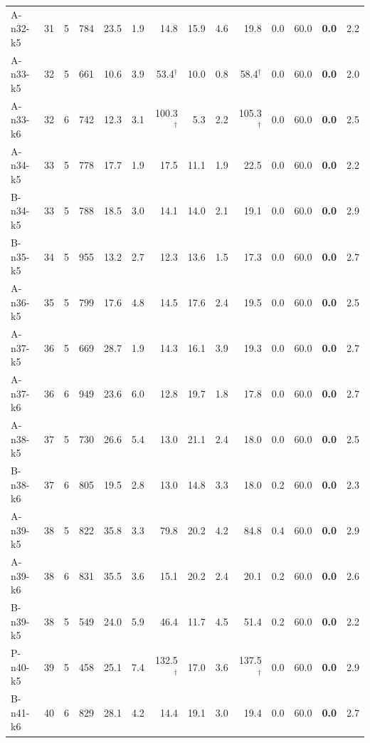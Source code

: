 \documentclass[preprint,3p,12pt,authoryear]{elsarticle}
\begin{document}
\begin{table}[h!]
{\begin{tabular}{lrrr|rrr|rrr|rr|rr}
A-n32-k5  & 31 & 5 & 784 & 23.5 & 1.9 & 14.8 & 15.9 & 4.6 & 19.8 & 0.0 & 60.0 & {\color{red}\textbf{0.0}} & {\color{red}2.2} \\
A-n33-k5  & 32 & 5 & 661 & 10.6 & 3.9 & 53.4$^\dagger$ & 10.0 & 0.8 & 58.4$^\dagger$ & 0.0 & 60.0 & {\color{red}\textbf{0.0}} & {\color{red}2.0} \\
A-n33-k6  & 32 & 6 & 742 & 12.3 & 3.1 & 100.3$^\dagger$ & 5.3 & 2.2 & 105.3$^\dagger$ & 0.0 & 60.0 & {\color{red}\textbf{0.0}} & {\color{red}2.5} \\
A-n34-k5  & 33 & 5 & 778 & 17.7 & 1.9 & 17.5 & 11.1 & 1.9 & 22.5 & 0.0 & 60.0 & {\color{red}\textbf{0.0}} & {\color{red}2.2} \\
B-n34-k5  & 33 & 5 & 788 & 18.5 & 3.0 & 14.1 & 14.0 & 2.1 & 19.1 & 0.0 & 60.0 & {\color{red}\textbf{0.0}} & {\color{red}2.9} \\
B-n35-k5  & 34 & 5 & 955 & 13.2 & 2.7 & 12.3 & 13.6 & 1.5 & 17.3 & 0.0 & 60.0 & {\color{red}\textbf{0.0}} & {\color{red}2.7} \\
A-n36-k5  & 35 & 5 & 799 & 17.6 & 4.8 & 14.5 & 17.6 & 2.4 & 19.5 & 0.0 & 60.0 & {\color{red}\textbf{0.0}} & {\color{red}2.5} \\
A-n37-k5  & 36 & 5 & 669 & 28.7 & 1.9 & 14.3 & 16.1 & 3.9 & 19.3 & 0.0 & 60.0 & {\color{red}\textbf{0.0}} & {\color{red}2.7} \\
A-n37-k6  & 36 & 6 & 949 & 23.6 & 6.0 & 12.8 & 19.7 & 1.8 & 17.8 & 0.0 & 60.0 & {\color{red}\textbf{0.0}} & {\color{red}2.7} \\
A-n38-k5  & 37 & 5 & 730 & 26.6 & 5.4 & 13.0 & 21.1 & 2.4 & 18.0 & 0.0 & 60.0 & {\color{red}\textbf{0.0}} & {\color{red}2.5} \\
B-n38-k6  & 37 & 6 & 805 & 19.5 & 2.8 & 13.0 & 14.8 & 3.3 & 18.0 & 0.2 & 60.0 & {\color{red}\textbf{0.0}} & {\color{red}2.3} \\
A-n39-k5  & 38 & 5 & 822 & 35.8 & 3.3 & 79.8 & 20.2 & 4.2 & 84.8 & 0.4 & 60.0 & {\color{red}\textbf{0.0}} & {\color{red}2.9} \\
A-n39-k6  & 38 & 6 & 831 & 35.5 & 3.6 & 15.1 & 20.2 & 2.4 & 20.1 & 0.2 & 60.0 & {\color{red}\textbf{0.0}} & {\color{red}2.6} \\
B-n39-k5  & 38 & 5 & 549 & 24.0 & 5.9 & 46.4 & 11.7 & 4.5 & 51.4 & 0.2 & 60.0 & {\color{red}\textbf{0.0}} & {\color{red}2.2} \\
P-n40-k5  & 39 & 5 & 458 & 25.1 & 7.4 & 132.5$^\dagger$ & 17.0 & 3.6 & 137.5$^\dagger$ & 0.0 & 60.0 & {\color{red}\textbf{0.0}} & {\color{red}2.9} \\
B-n41-k6  & 40 & 6 & 829 & 28.1 & 4.2 & 14.4 & 19.1 & 3.0 & 19.4 & 0.0 & 60.0 & {\color{red}\textbf{0.0}} & {\color{red}2.7} \\

\end{tabular}}
\end{table}
\end{document}

